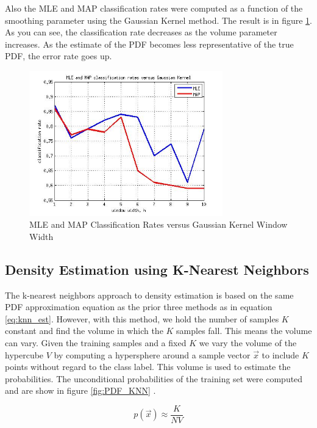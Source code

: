 \documentclass[journal]{IEEEtran}
\begin{document}
\par Also the MLE and MAP classification rates were computed as a function of the smoothing parameter using the Gaussian Kernel method. The result is in figure \ref{fig:ClassRate_GaussianKernel}. As you can see, the classification rate decreases as the volume parameter increases. As the estimate of the PDF becomes less representative of the true PDF, the error rate goes up.

\begin{figure}[h]
\centering
\includegraphics[width=3.3in]{../images/ClassRate_GaussianKernel.jpg}
\caption{MLE and MAP Classification Rates versus Gaussian Kernel Window Width}
\label{fig:ClassRate_GaussianKernel}
\end{figure}

\subsection{Density Estimation using K-Nearest Neighbors}
\par The k-nearest neighbors approach to density estimation is based on the same PDF approximation equation as the prior three methods as in equation \ref{eq:knn_est}. However, with this method, we hold the number of samples \(K\) constant and find the volume in which the \(K\) samples fall. This means the volume can vary. Given the training samples and a fixed \(K\) we vary the volume of the hypercube \(V\) by computing a hypersphere around a sample vector \(\vec{x}\) to include \(K\) points without regard to the class label. This volume is used to estimate the probabilities. The unconditional probabilities of the training set were computed and are show in figure \ref{fig:PDF_KNN} \cite{densityhandout} \cite[p.55-57]{bishop}.

\begin{equation}
\label{eq:knn_est}
p(\vec{x}) \approx \frac{K}{N V}
\end{equation}
\end{document}
